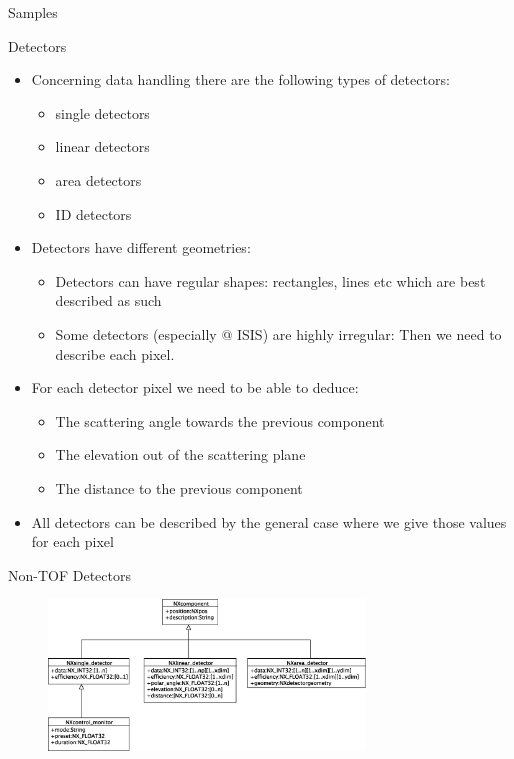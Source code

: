 \documentclass[final,nototal,pdf,mark]{prosper}
\begin{document}
\begin{slide}{Samples }
\end{slide}\begin{slide}{Detectors }
\begin{itemize}\item Concerning data handling there are the following types of detectors:
\begin{itemize}\item single detectors
\item linear detectors
\item area detectors
\item ID detectors 
\end{itemize}\item Detectors have different geometries:
\begin{itemize}\item Detectors can have regular shapes: rectangles, lines etc which are best described as such
\item Some detectors (especially @ ISIS) are highly irregular: Then we need to describe each pixel.
\end{itemize}\item For each detector pixel we need to be able to deduce:
\begin{itemize}\item The scattering angle towards the previous component 
\item The elevation out of the scattering plane
\item The distance to the previous component
\end{itemize}\item All detectors can be described by the general case where we give those values for each pixel
\end{itemize}
\end{slide}\begin{slide}{Non-TOF Detectors }
\begin{center}
\begin{figure}
\includegraphics[width=0.75\textwidth]{nxdet.eps}\end{figure}




\end{center}
\end{slide}
\end{document}
